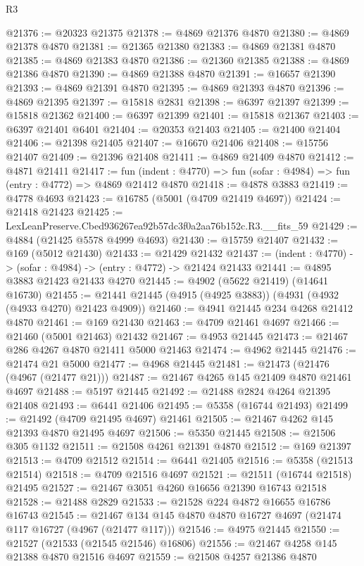 \begin{lexlean}{R3}
\begin{coremodule}
@21376 := @20323 @21375
@21378 := @4869 @21376 @4870
@21380 := @4869 @21378 @4870
@21381 := @21365 @21380
@21383 := @4869 @21381 @4870
@21385 := @4869 @21383 @4870
@21386 := @21360 @21385
@21388 := @4869 @21386 @4870
@21390 := @4869 @21388 @4870
@21391 := @16657 @21390
@21393 := @4869 @21391 @4870
@21395 := @4869 @21393 @4870
@21396 := @4869 @21395
@21397 := @15818 @2831
@21398 := @6397 @21397
@21399 := @15818 @21362
@21400 := @6397 @21399
@21401 := @15818 @21367
@21403 := @6397 @21401 @6401
@21404 := @20353 @21403
@21405 := @21400 @21404
@21406 := @21398 @21405
@21407 := @16670 @21406
@21408 := @15756 @21407
@21409 := @21396 @21408
@21411 := @4869 @21409 @4870
@21412 := @4871 @21411
@21417 := fun (indent : @4770) => fun (sofar : @4984) => fun (entry : @4772) => @4869 @21412 @4870
@21418 := @4878 @3883
@21419 := @4778 @4693
@21423 := @16785 (@5001 (@4709 @21419 @4697))
@21424 := @21418 @21423
@21425 := LexLeanPreserve.Cbed936267ea92b57dc3f0a2aa76b152c.R3.__fits_59
@21429 := @4884 (@21425 @5578 @4999 @4693)
@21430 := @15759 @21407
@21432 := @169 (@5012 @21430)
@21433 := @21429 @21432
@21437 := (indent : @4770) -> (sofar : @4984) -> (entry : @4772) -> @21424 @21433
@21441 := @4895 @3883 @21423 @21433 @4270
@21445 := @4902 (@5622 @21419) (@14641 @16730)
@21455 := @21441 @21445 (@4915 (@4925 @3883)) (@4931 (@4932 (@4933 @4270) @21423 @4909))
@21460 := @4941 @21445 @234 @4268 @21412 @4870
@21461 := @169 @21430
@21463 := @4709 @21461 @4697
@21466 := @21460 (@5001 @21463) @21432
@21467 := @4953 @21445
@21473 := @21467 @286 @4267 @4870 @21411 @5000 @21463
@21474 := @4962 @21445
@21476 := @21474 @21 @5000
@21477 := @4968 @21445
@21481 := @21473 (@21476 (@4967 (@21477 @21)))
@21487 := @21467 @4265 @145 @21409 @4870 @21461 @4697
@21488 := @5197 @21445
@21492 := @21488 @2824 @4264 @21395 @21408
@21493 := @6441 @21406
@21495 := @5358 (@16744 @21493)
@21499 := @21492 (@4709 @21495 @4697) @21461
@21505 := @21467 @4262 @145 @21393 @4870 @21495 @4697
@21506 := @5350 @21445
@21508 := @21506 @305 @1132
@21511 := @21508 @4261 @21391 @4870
@21512 := @169 @21397
@21513 := @4709 @21512
@21514 := @6441 @21405
@21516 := @5358 (@21513 @21514)
@21518 := @4709 @21516 @4697
@21521 := @21511 (@16744 @21518) @21495
@21527 := @21467 @3051 @4260 @16656 @21390 @16743 @21518
@21528 := @21488 @2829
@21533 := @21528 @224 @4872 @16655 @16786 @16743
@21545 := @21467 @134 @145 @4870 @4870 @16727 @4697 (@21474 @117 @16727 (@4967 (@21477 @117)))
@21546 := @4975 @21445
@21550 := @21527 (@21533 (@21545 @21546) @16806)
@21556 := @21467 @4258 @145 @21388 @4870 @21516 @4697
@21559 := @21508 @4257 @21386 @4870

\end{coremodule}
\end{lexlean}
